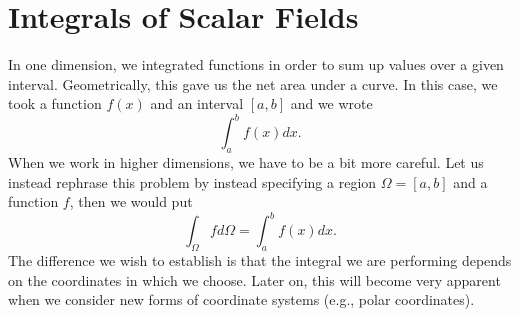 %                            
%                            
                        
                       
                
                
                \section{Integrals of Scalar Fields}
                
                In one dimension, we integrated functions in order to sum up values over a given interval.  Geometrically, this gave us the net area under a curve.  In this case, we took a function $f(x)$ and an interval $[a,b]$ and we wrote
                \[
                \int_a^b f(x) dx.
                \]
                When we work in higher dimensions, we have to be a bit more careful.  Let us instead rephrase this problem by instead specifying a region $\Omega = [a,b]$ and a function $f$, then we would put
                \[
                \int_\Omega f d\Omega = \int_a^b f(x)dx.
                \]
                The difference we wish to establish is that the integral we are performing depends on the coordinates in which we choose.  Later on, this will become very apparent when we consider new forms of coordinate systems (e.g., polar coordinates).  
                
